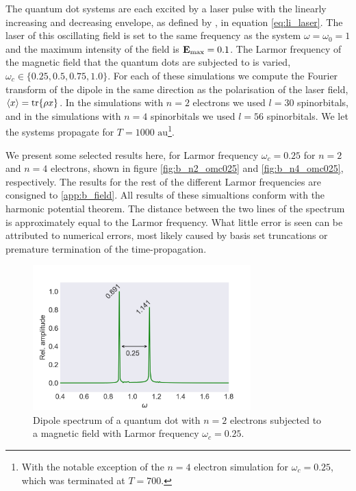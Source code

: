The quantum dot systems are each excited by a laser pulse with the linearly increasing 
and decreasing envelope, as defined by \citeauthor{li2005time}\cite{li2005time}, in 
equation \autoref{eq:li_laser}. The laser of this oscillating field is set to the 
same frequency as the system $\omega=\omega_0=1$ and the maximum intensity of the field 
is $\vb{E}_\text{max} = 0.1$. The Larmor frequency of the magnetic field that the 
quantum dots are subjected to is varied, $\omega_c\in\{0.25, 0.5, 0.75, 1.0\}$.
For each of these simulations we compute the Fourier transform of the dipole in 
the same direction as the polarisation of the laser field, $\ev{x} =\tr{\rho x}$.
In the simulations with $n=2$ electrons we used $l=30$ spinorbitals,
and in the simulations with $n=4$ spinorbitals we used $l=56$ spinorbitals.
We let the systems propagate for $T = 1000 \text{ au}$\footnote{With the notable 
exception of the $n=4$ electron simulation for $\omega_c=0.25$, which was terminated 
at $T=700$.}.

We present some selected results here, for Larmor frequency $\omega_c=0.25$ for 
$n=2$ and $n=4$ electrons, shown in figure \autoref{fig:b_n2_omc025}
and \autoref{fig:b_n4_omc025}, respectively.
The results for 
the rest of the different Larmor frequencies are consigned to \autoref{app:b_field}.
All results of these simualtions conform with the harmonic potential theorem. The 
distance between the two lines of the spectrum is approximately equal to the 
Larmor frequency. What little error is seen can be attributed to numerical errors,
most likely caused by basis set truncations or premature termination of the
time-propagation.

\begin{figure}
    \centering
    \includegraphics[width=0.75\textwidth]
        {results/figures/B_field/n=2/b_spectrum_omc025.png}
    \caption{Dipole spectrum of a quantum dot with $n=2$ electrons
    subjected to a magnetic field with Larmor frequency $\omega_c=0.25$.} 
    \label{fig:b_n2_omc025}
\end{figure}

